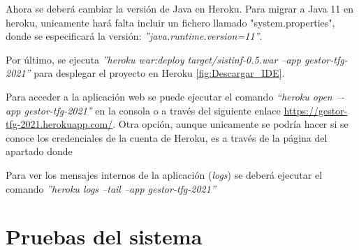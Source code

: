 
Ahora se deberá cambiar la versión de Java en Heroku. Para migrar a Java 11 en heroku, unicamente hará falta incluir un fichero llamado "system.properties", donde se especificará la versión: \emph{''java.runtime.version=11''}.

Por último, se ejecuta \emph{''heroku war:deploy target/sistinf-0.5.war --app gestor-tfg-2021''} para desplegar el proyecto en Heroku \ref{fig:Descargar_IDE}. 


Para acceder a la aplicación web se puede ejecutar el comando \emph{“heroku open –-app gestor-tfg-2021”} en la consola o a través del siguiente enlace \href{https://gestor-tfg-2021.herokuapp.com/}{https://gestor-tfg-2021.herokuapp.com/}. Otra opción, aunque unicamente se podría hacer si se conoce los credenciales de la cuenta de Heroku, es a través de la página del apartado donde 

Para ver los mensajes internos de la aplicación (\emph{logs}) se deberá ejecutar el comando \emph{''heroku logs --tail --app gestor-tfg-2021''}

\section{Pruebas del sistema}
